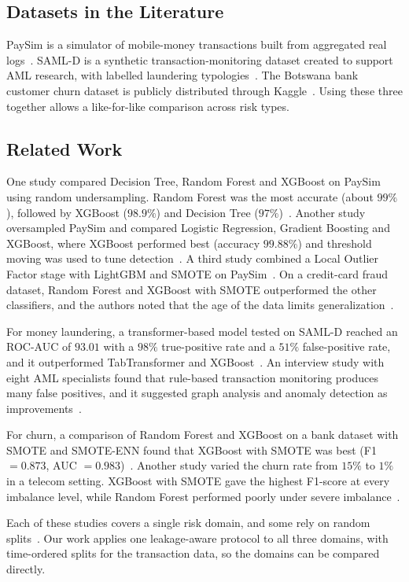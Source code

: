 \documentclass[10pt,twocolumn,a4paper]{article}
\begin{document}
\subsection{Datasets in the Literature}
PaySim is a simulator of mobile-money transactions built from aggregated real logs~\cite{lopez2016}. SAML-D is a synthetic transaction-monitoring dataset created to support AML research, with labelled laundering typologies~\cite{oztas2023}. The Botswana bank customer churn dataset is publicly distributed through Kaggle~\cite{mfazi}. Using these three together allows a like-for-like comparison across risk types.

\subsection{Related Work}
One study compared Decision Tree, Random Forest and XGBoost on PaySim using random undersampling. Random Forest was the most accurate (about $99\%$), followed by XGBoost ($98.9\%$) and Decision Tree ($97\%$)~\cite{mulyana2025}. Another study oversampled PaySim and compared Logistic Regression, Gradient Boosting and XGBoost, where XGBoost performed best (accuracy $99.88\%$) and threshold moving was used to tune detection~\cite{doddamani2024}. A third study combined a Local Outlier Factor stage with LightGBM and SMOTE on PaySim~\cite{tetik2025}. On a credit-card fraud dataset, Random Forest and XGBoost with SMOTE outperformed the other classifiers, and the authors noted that the age of the data limits generalization~\cite{andrade2025}.

For money laundering, a transformer-based model tested on SAML-D reached an ROC-AUC of $93.01$ with a $98\%$ true-positive rate and a $51\%$ false-positive rate, and it outperformed TabTransformer and XGBoost~\cite{oztas2025}. An interview study with eight AML specialists found that rule-based transaction monitoring produces many false positives, and it suggested graph analysis and anomaly detection as improvements~\cite{oztas2024}.

For churn, a comparison of Random Forest and XGBoost on a bank dataset with SMOTE and SMOTE-ENN found that XGBoost with SMOTE was best (F1 $=0.873$, AUC $=0.983$)~\cite{andespa2025}. Another study varied the churn rate from $15\%$ to $1\%$ in a telecom setting. XGBoost with SMOTE gave the highest F1-score at every imbalance level, while Random Forest performed poorly under severe imbalance~\cite{imani2025}.

Each of these studies covers a single risk domain, and some rely on random splits~\cite{mulyana2025,andrade2025}. Our work applies one leakage-aware protocol to all three domains, with time-ordered splits for the transaction data, so the domains can be compared directly.
\end{document}
